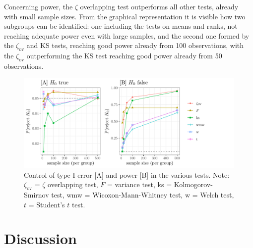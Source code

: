\documentclass[twocolumn]{article}\usepackage[]{graphicx}\usepackage[]{xcolor}
\makeatletter
\def\maxwidth{ %
  \ifdim\Gin@nat@width>\linewidth
    \linewidth
  \else
    \Gin@nat@width
  \fi
}
\newenvironment{knitrout}{}{} %
\makeatother
\begin{document}
Concerning power, the $\zeta$ overlapping test outperforms all other tests, already with small sample sizes. From the graphical representation it is visible how two subgroups can be identified: one including the tests on means and ranks, not reaching adequate power even with large samples, and the second one formed by the $\zeta_{\mbox{ov}}$ and KS tests, reaching good power already from 100 observations, with the $\zeta_{\mbox{ov}}$ outperforming the KS test reaching good power already from 50 observations.


\begin{figure}[!h]
\begin{knitrout}
\color{fgcolor}

{\centering \includegraphics[width=\maxwidth]{figure/global-1} 

}


\end{knitrout}
\caption{Control of type I error [A] and power [B] in the various tests. Note: $\zeta_{\mbox{ov}}$ = $\zeta$  overlapping test, $F$ = variance test, ks = Kolmogorov-Smirnov test, wmw = Wicoxon-Mann-Whitney test, w = Welch test, $t$ = Student's $t$ test. \label{fig:global}}
\end{figure}



\section{Discussion}
\end{document}
